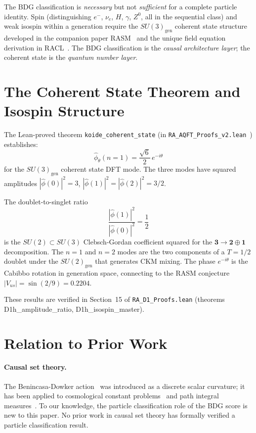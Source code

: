 \documentclass[11pt,a4paper]{article}
\begin{document}
The BDG classification is \emph{necessary} but not \emph{sufficient}
for a complete particle identity. Spin (distinguishing $e^-$, $\nu_e$,
$H$, $\gamma$, $Z^0$, all in the sequential class) and weak isospin
within a generation require the $SU(3)_{\mathrm{gen}}$ coherent state
structure developed in the companion paper
RASM~\citep{Sandeman2026RASM} and the unique field equation derivation in RACL~\citep{Sandeman2026RACL}. The BDG classification is the
\emph{causal architecture layer}; the coherent state is the
\emph{quantum number layer}.

\section{The Coherent State Theorem and Isospin Structure}
\label{sec:D1h}

The Lean-proved theorem \texttt{koide\_coherent\_state}
(in \texttt{RA\_AQFT\_Proofs\_v2.lean}~\citep{Meiburg2025LQI}) establishes:
\[
  \hat{\phi}_\theta(n=1) = \frac{\sqrt{6}}{2}\,e^{-i\theta}
\]
for the $SU(3)_{\mathrm{gen}}$ coherent state DFT mode. The
three modes have squared amplitudes
$|\hat{\phi}(0)|^2 = 3$, $|\hat{\phi}(1)|^2 = |\hat{\phi}(2)|^2 = 3/2$.

The doublet-to-singlet ratio
\[
  \frac{|\hat{\phi}(1)|^2}{|\hat{\phi}(0)|^2} = \frac{1}{2}
\]
is the $SU(2) \subset SU(3)$ Clebsch-Gordan coefficient squared for
the $\mathbf{3} \to \mathbf{2} \oplus \mathbf{1}$ decomposition.
The $n=1$ and $n=2$ modes are the two components of a $T=1/2$ doublet
under the $SU(2)_{\mathrm{gen}}$ that generates CKM mixing. The
phase $e^{-i\theta}$ is the Cabibbo rotation in generation space,
connecting to the RASM conjecture $|V_{us}| = \sin(2/9) = 0.2204$.

These results are verified in Section~15 of \texttt{RA\_D1\_Proofs.lean}
(theorems D1h\_amplitude\_ratio, D1h\_isospin\_master).

\section{Relation to Prior Work}
\label{sec:related}

\paragraph{Causal set theory.}
The Benincasa-Dowker action~\citep{Benincasa2010} was introduced as a
discrete scalar curvature; it has been applied to cosmological
constant problems~\citep{Sorkin2005} and path integral
measures~\citep{Dowker2013}. To our knowledge, the particle
classification role of the BDG score is new to this paper.
No prior work in causal set theory has formally verified a particle
classification result.
\end{document}
